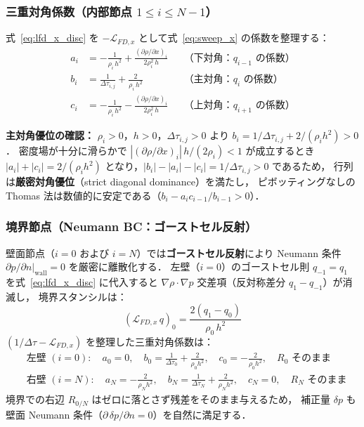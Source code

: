 \subsubsection*{三重対角係数（内部節点 \texorpdfstring{$1 \le i \le N-1$}{1 ≤ i ≤ N-1}）}

式~\eqref{eq:lfd_x_disc} を $-\mathcal{L}_{FD,x}$ として式~\eqref{eq:sweep_x} の係数を整理する：
\begin{align}
  a_i &= -\frac{1}{\rho_i\,h^2} + \frac{(\partial\rho/\partial x)_i}{2\rho_i^2\,h}
          &&\text{（下対角：$q_{i-1}$ の係数）}
  \label{eq:coeff_a}\\
  b_i &= \frac{1}{\Delta\tau_{i,j}} + \frac{2}{\rho_i\,h^2}
          &&\text{（主対角：$q_i$ の係数）}
  \label{eq:coeff_b}\\
  c_i &= -\frac{1}{\rho_i\,h^2} - \frac{(\partial\rho/\partial x)_i}{2\rho_i^2\,h}
          &&\text{（上対角：$q_{i+1}$ の係数）}
  \label{eq:coeff_c}
\end{align}

\textbf{主対角優位の確認：}
$\rho_i > 0$，$h > 0$，$\Delta\tau_{i,j} > 0$ より $b_i = 1/\Delta\tau_{i,j} + 2/(\rho_i h^2) > 0$．
密度場が十分に滑らかで $|(\partial\rho/\partial x)_i|\,h/(2\rho_i) < 1$ が成立するとき
$|a_i|+|c_i| = 2/(\rho_i h^2)$ となり，$|b_i| - |a_i| - |c_i| = 1/\Delta\tau_{i,j} > 0$ であるため，
行列は\textbf{厳密対角優位}（strict diagonal dominance）を満たし，
ピボッティングなしの Thomas 法は数値的に安定である（$b_i - a_i c_{i-1}/b_{i-1} > 0$）．

\subsubsection*{境界節点（Neumann BC：ゴーストセル反射）}

壁面節点（$i=0$ および $i=N$）では\textbf{ゴーストセル反射}により Neumann 条件
$\partial p/\partial n|_\text{wall} = 0$ を厳密に離散化する．
左壁（$i=0$）のゴーストセル則 $q_{-1} = q_1$ を式~\eqref{eq:lfd_x_disc} に代入すると
$\nabla\rho \cdot \nabla p$ 交差項（反対称差分 $q_1 - q_{-1}$）が消滅し，
境界スタンシルは：
\begin{equation}
  (\mathcal{L}_{FD,x}\,q)_0 = \frac{2(q_1 - q_0)}{\rho_0\,h^2}
  \label{eq:lfd_bc_ghost}
\end{equation}
$(1/\Delta\tau - \mathcal{L}_{FD,x})$ を整理した三重対角係数は：
\begin{align}
  &\text{左壁 }(i=0):\quad
    a_0 = 0,\quad
    b_0 = \tfrac{1}{\Delta\tau_0} + \tfrac{2}{\rho_0 h^2},\quad
    c_0 = -\tfrac{2}{\rho_0 h^2},\quad
    R_0 \text{ そのまま}
  \label{eq:sweep_bc_left}\\
  &\text{右壁 }(i=N):\quad
    a_N = -\tfrac{2}{\rho_N h^2},\quad
    b_N = \tfrac{1}{\Delta\tau_N} + \tfrac{2}{\rho_N h^2},\quad
    c_N = 0,\quad
    R_N \text{ そのまま}
  \label{eq:sweep_bc_right}
\end{align}
境界での右辺 $R_{0/N}$ はゼロに落とさず残差をそのまま与えるため，
補正量 $\delta p$ も壁面 Neumann 条件（$\partial\,\delta p/\partial n = 0$）を自然に満足する．


